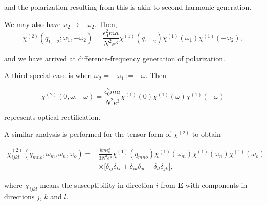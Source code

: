 \documentclass{article}
\begin{document}
and the polarization resulting from this is akin to second-harmonic generation.

We may also have $\omega_2 \rightarrow -\omega_2$. Then,
\begin{equation}
\chi^{(2)}(q_{1,-2};\omega_1, -\omega_2) = \frac{\epsilon_0^2ma}{N^2e^3}\chi^{(1)}(q_{1,-2})\chi^{(1)}(\omega_1)\chi^{(1)}(-\omega_2),
\end{equation}

and we have arrived at difference-frequency generation of polarization.

A third special case is when $\omega_2 = -\omega_1 := -\omega$. Then

\begin{equation}
\chi^{(2)}(0,\omega,-\omega) = \frac{\epsilon_0^2ma}{N^2e^3}\chi^{(1)}(0)\chi^{(1)}(\omega)\chi^{(1)}(-\omega)
\end{equation}

represents optical rectification.

A similar analysis is performed for the tensor form of $\chi^{(2)}$ to obtain

\begin{equation}
\begin{aligned}
\chi_{ijkl}^{(2)}(q_{mno}, \omega_m, \omega_n, \omega_o) = & \frac{bm\epsilon_0^3}{3N^3e^4}\chi^{(1)}(q_{mno})\chi^{(1)}(\omega_m)\chi^{(1)}(\omega_n)\chi^{(1)}(\omega_o) \\
& \times \bigg[ \delta_{ij}\delta_{kl}+\delta_{ik}\delta_{jl}+\delta_{il}\delta_{jk} \bigg],
\end{aligned}
\end{equation}

where $\chi_{ijkl}$ means the susceptibility in direction $i$ from $\bm{E}$ with components in directions $j$, $k$ and $l$.
\end{document}
